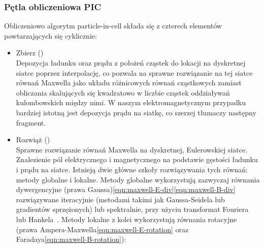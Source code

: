     \subsubsection{Pętla obliczeniowa PIC}
    Obliczeniowo algorytm particle-in-cell składa się z czterech elementów
    powtarzających się cyklicznie:
    \begin{itemize}
        \item Zbierz ()\\
    Depozycja ładunku oraz prądu z położeń cząstek do lokacji na dyskretnej
    siatce poprzez interpolację, co pozwala na sprawne rozwiązanie na tej
    siatce równań Maxwella jako układu różnicowych równań cząstkowych zamiast
    obliczania skalujących się kwadratowo w liczbie cząstek oddziaływań
    kulombowskich między nimi.  W naszym elektromagnetycznym przypadku bardziej
    istotną jest depozycja prądu na siatkę, co szerzej tłumaczy następny
    fragment.
    \item Rozwiąż ()\\
    Sprawne rozwiązanie równań Maxwella na dyskretnej, Eulerowskiej siatce.
    Znalezienie pól elektrycznego i magnetycznego na podstawie gęstości ładunku
    i prądu na siatce.  Istnieją dwie główne szkoły rozwiązywania tych równań:
    metody globalne i lokalne. Metody globalne wykorzystują zazwyczaj równania
    dywergencyjne (prawa Gaussa)\ref{eqn:maxwell-E-div}\ref{eqn:maxwell-B-div}
    rozwiązywane iteracyjnie (metodami takimi jak Gaussa-Seidela lub gradientów
    sprzężonych)
     lub spektralnie, przy użyciu transformat Fouriera lub Hankela~\cite{fbpic}.
     Metody lokalne z kolei
    wykorzystują równania rotacyjne (prawa Ampera-Maxwella\ref{eqn:maxwell-E-rotation}
    oraz Faradaya\ref{eqn:maxwell-B-rotation}):


\end{itemize}
